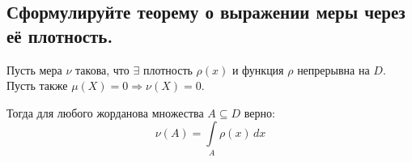 
\subsection{Сформулируйте теорему о выражении меры через её плотность.}
  \begin{theorem}
      Пусть мера $\nu$ такова, что $\exists$ плотность $\rho(x)$ и функция $\rho$ непрерывна на $D$.\\ 
      Пусть также $\mu(X) = 0 \Rightarrow \nu(X) = 0$.
      
      Тогда для любого жорданова множества $A \subseteq D$ верно:
      \[ \nu(A) = \int\limits_A \rho(x)\, dx \]
  \end{theorem}
